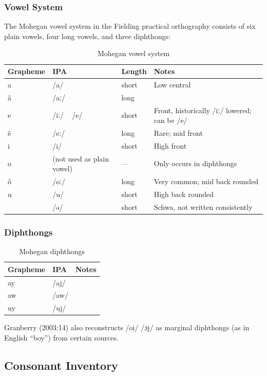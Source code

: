 \subsubsection{Vowel System}

The Mohegan vowel system in the Fielding practical orthography consists of
six plain vowels, four long vowels, and three diphthongs:

\begin{table}[h]
\centering
\begin{tabular}{llll}
\toprule
Grapheme & IPA & Length & Notes \\
\midrule
a & /a/ & short & Low central \\
â & /aː/ & long & \\
e & /iː/ ~ /e/ & short & Front, historically /iː/ lowered; can be /e/ \\
ê & /eː/ & long & Rare; mid front \\
i & /i/ & short & High front \\
o & (not used as plain vowel) & --- & Only occurs in diphthongs \\
ô & /oː/ & long & Very common; mid back rounded \\
u & /u/ & short & High back rounded \\
 & /ə/ & short & Schwa, not written consistently \\
\bottomrule
\end{tabular}
\caption{Mohegan vowel system}
\label{tab:1364-vowels}
\end{table}

\subsubsection{Diphthongs}

\begin{table}[h]
\centering
\begin{tabular}{lll}
\toprule
Grapheme & IPA & Notes \\
\midrule
ay & /aj/ & \\
aw & /aw/ & \\
uy & /uj/ & \\
\bottomrule
\end{tabular}
\caption{Mohegan diphthongs}
\label{tab:1364-diphthongs}
\end{table}

Granberry (2003:14) also reconstructs /oi/ /ɔj/ as marginal diphthongs (as in
English ``boy'') from certain sources.

\subsection{Consonant Inventory}


